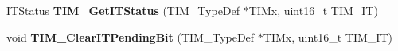 \begin{DoxyCompactItemize}
\item 
\hypertarget{group__TIM__Exported__Functions_ga0827a0b411707304f76d33050727c24d}{
ITStatus {\bfseries TIM\_\-GetITStatus} (TIM\_\-TypeDef $\ast$TIMx, uint16\_\-t TIM\_\-IT)}
\label{group__TIM__Exported__Functions_ga0827a0b411707304f76d33050727c24d}

\item 
\hypertarget{group__TIM__Exported__Functions_ga9eb1e95af71ed380f51a2c6d585cc5d6}{
void {\bfseries TIM\_\-ClearITPendingBit} (TIM\_\-TypeDef $\ast$TIMx, uint16\_\-t TIM\_\-IT)}
\label{group__TIM__Exported__Functions_ga9eb1e95af71ed380f51a2c6d585cc5d6}

\end{DoxyCompactItemize}
